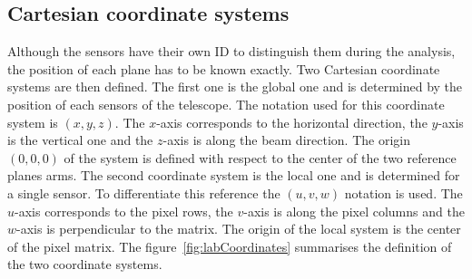 
    \subsection{Cartesian coordinate systems}

    Although the sensors have their own ID to distinguish them during the analysis, the position of each plane has to be known exactly.
    Two Cartesian coordinate systems are then defined.
    The first one is the global one and is determined by the position of each sensors of the telescope.
    The notation used for this coordinate system is $(x,y,z)$.
    The $x$-axis corresponds to the horizontal direction, the $y$-axis is the vertical one and the $z$-axis is along the beam direction.
    The origin $(0,0,0)$ of the system is defined with respect to the center of the two reference planes arms.
    The second coordinate system is the local one and is determined for a single sensor.
    To differentiate this reference the $(u,v,w)$ notation is used.
    The $u$-axis corresponds to the pixel rows, the $v$-axis is along the pixel columns and the $w$-axis is perpendicular to the matrix.
    The origin of the local system is the center of the pixel matrix.
    The figure~\ref{fig:labCoordinates} summarises the definition of the two coordinate systems.

